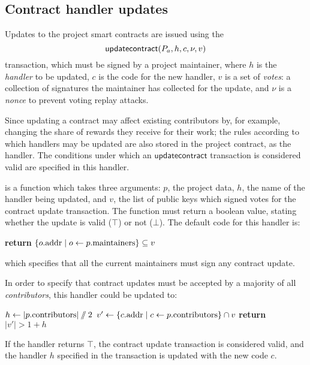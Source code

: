 \subsection{Contract handler updates}

Updates to the project smart contracts are issued using the
\[
    \mathsf{updatecontract}\lparen P_a, h, c, \nu, v\rparen
\]
transaction, which must be signed by a project maintainer, where $h$ is the
\emph{handler} to be updated, $c$ is the code for the new handler, $v$ is a set
of \emph{votes}: a collection of signatures the maintainer has collected for the
update, and $\nu$ is a \emph{nonce} to prevent voting replay attacks.

Since updating a contract may affect existing contributors by, for example,
changing the share of rewards they receive for their work; the rules according
to which handlers may be updated are also stored in the project contract, as the
 handler. The conditions under which an
$\mathsf{updatecontract}$ transaction is considered valid are specified in this
handler.

 is a function which takes three arguments: $p$,
the project data, $h$, the name of the handler being updated, and $v$, the list
of public keys which signed votes for the contract update transaction. The
function must return a boolean value, stating whether the update is valid ($\top$)
or not ($\bot$). The default code for this handler is:
\begin{algorithmic}[0]
        \State \textbf{return} $\{ o.{\mathrm{addr}} \mid o \gets p.{\mathrm{maintainers}} \} \subseteq v$
    \EndProcedure
\end{algorithmic}
which specifies that all the current maintainers must sign any contract update.

In order to specify that contract updates must be accepted by a majority of all
\emph{contributors}, this handler could be updated to:
\begin{algorithmic}[0]
        \State $h \gets |p.{\mathrm{contributors}}| \sslash 2$
        \State $v' \gets \{ c.{\mathrm{addr}} \mid c \gets p.{\mathrm{contributors}} \} \cap v$
        \State \textbf{return} $|v'| > 1 + h$
    \EndProcedure
\end{algorithmic}
If the handler returns $\top$, the contract update transaction is considered
valid, and the handler $h$ specified in the transaction is updated with the new code
$c$.

